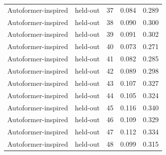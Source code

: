 \begin{tabular}{llrrr}
Autoformer-inspired & held-out & 37 & 0.084 & 0.289 \\
Autoformer-inspired & held-out & 38 & 0.090 & 0.300 \\
Autoformer-inspired & held-out & 39 & 0.091 & 0.302 \\
Autoformer-inspired & held-out & 40 & 0.073 & 0.271 \\
Autoformer-inspired & held-out & 41 & 0.082 & 0.285 \\
Autoformer-inspired & held-out & 42 & 0.089 & 0.298 \\
Autoformer-inspired & held-out & 43 & 0.107 & 0.327 \\
Autoformer-inspired & held-out & 44 & 0.105 & 0.324 \\
Autoformer-inspired & held-out & 45 & 0.116 & 0.340 \\
Autoformer-inspired & held-out & 46 & 0.109 & 0.329 \\
Autoformer-inspired & held-out & 47 & 0.112 & 0.334 \\
Autoformer-inspired & held-out & 48 & 0.099 & 0.315 \\
\bottomrule
\end{tabular}
